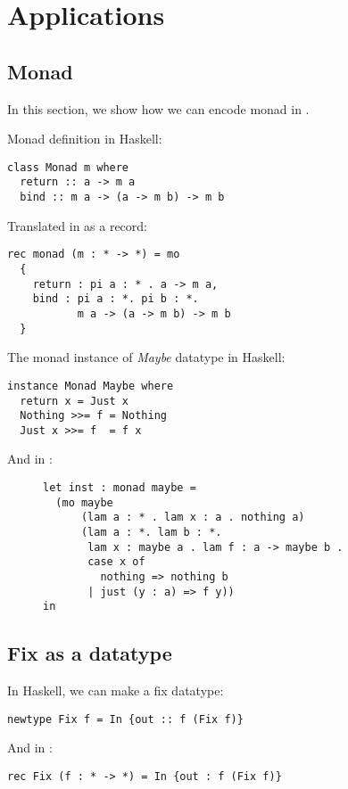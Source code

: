 
\section{Applications}
\label{sec:app}


\subsection{Monad}
\label{sec:monad}

In this section, we show how we can encode monad in \name.

Monad definition in Haskell:
\begin{lstlisting}
class Monad m where
  return :: a -> m a
  bind :: m a -> (a -> m b) -> m b
\end{lstlisting}

Translated in \name as a record:

\begin{lstlisting}
rec monad (m : * -> *) = mo
  {
    return : pi a : * . a -> m a,
    bind : pi a : *. pi b : *.
           m a -> (a -> m b) -> m b
  }
\end{lstlisting}

The monad instance of \emph{Maybe} datatype in Haskell:

\begin{lstlisting}
instance Monad Maybe where
  return x = Just x
  Nothing >>= f = Nothing
  Just x >>= f  = f x
\end{lstlisting}

And in \name:
\begin{figure}[ht]
  \centering
\begin{lstlisting}
let inst : monad maybe =
  (mo maybe
      (lam a : * . lam x : a . nothing a)
      (lam a : *. lam b : *.
       lam x : maybe a . lam f : a -> maybe b .
       case x of
         nothing => nothing b
       | just (y : a) => f y))
in
\end{lstlisting}
\end{figure}

\subsection{Fix as a datatype}
\label{sec:fix}

In Haskell, we can make a fix datatype:
\begin{lstlisting}
newtype Fix f = In {out :: f (Fix f)}
\end{lstlisting}

And in \name:
\begin{lstlisting}
rec Fix (f : * -> *) = In {out : f (Fix f)}
\end{lstlisting}


